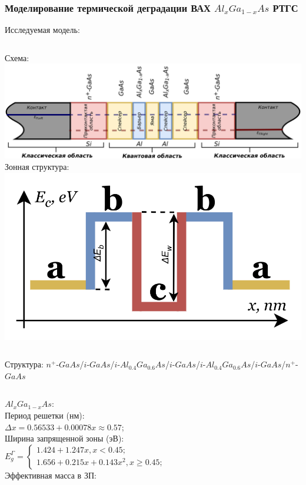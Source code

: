 \documentclass[10pt,pdf,hyperref={unicode},aspectratio={169}]{beamer}
\begin{document}
\begin{frame}
	\frametitle{Моделирование термической деградации ВАХ $Al_{x}Ga_{1-x}As$ РТГС}
	{\color{blue}\large Исследуемая модель:}
	\begin{columns}
		{\color{red} Схема:}
	   	\includegraphics[width=.99\linewidth,center]{assets/RTHSModelDiff}
		{\color{red} Зонная структура:}
	   	\includegraphics[width=.99\linewidth,center]{assets/BD}
	\end{columns}
{\color{red}Структура}: $n^{+}$-$GaAs$/$i$-$GaAs$/$i$-$Al_{0.4}Ga_{0.6}As$/$i$-$GaAs$/$i$-$Al_{0.4}Ga_{0.6}As$/$i$-$GaAs$/$n^{+}$-$GaAs$
	\begin{columns}
	\column{0.40\textwidth}
		{\color{blue} $Al_{x}Ga_{1-x}As$:}\\
		{\color{red}\footnotesize Период решетки (нм):}\\
		\scriptsize
			$\Delta x = 0.56533+0.00078x \approx 0.57$;\\
		{\color{red}\footnotesize Ширина запрященной зоны (эВ):}\\
		\scriptsize
			$E_{g}^{\Gamma} = \begin{cases}
				1.424+1.247x, x < 0.45;\\
				1.656+0.215x+0.143x^{2}, x \geq 0.45;
			\end{cases}$\\
		{\color{red}\footnotesize Эффективная масса в ЗП:}\\

\end{columns}
\end{frame}
\end{document}
